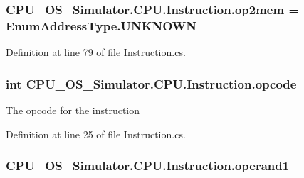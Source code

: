 \subsubsection[{op2mem}]{ C\+P\+U\+\_\+\+O\+S\+\_\+\+Simulator.\+C\+P\+U.\+Instruction.\+op2mem = {\bf Enum\+Address\+Type.\+U\+N\+K\+N\+O\+W\+N}\hspace{0.3cm}{\ttfamily [private]}}\label{class_c_p_u___o_s___simulator_1_1_c_p_u_1_1_instruction_aff693a62e411c80f794d0443addfd04b}


Definition at line 79 of file Instruction.\+cs.

\hypertarget{class_c_p_u___o_s___simulator_1_1_c_p_u_1_1_instruction_aa8fa753bf6e1b6ffff7060ec90f930af}{}
\subsubsection[{opcode}]{\setlength{\rightskip}{0pt plus 5cm}int C\+P\+U\+\_\+\+O\+S\+\_\+\+Simulator.\+C\+P\+U.\+Instruction.\+opcode\hspace{0.3cm}{\ttfamily [private]}}\label{class_c_p_u___o_s___simulator_1_1_c_p_u_1_1_instruction_aa8fa753bf6e1b6ffff7060ec90f930af}


The opcode for the instruction 



Definition at line 25 of file Instruction.\+cs.

\hypertarget{class_c_p_u___o_s___simulator_1_1_c_p_u_1_1_instruction_ab829270aeebc597814ded59f5265b452}{}
\subsubsection[{operand1}]{ C\+P\+U\+\_\+\+O\+S\+\_\+\+Simulator.\+C\+P\+U.\+Instruction.\+operand1\hspace{0.3cm}{\ttfamily [private]}}\label{class_c_p_u___o_s___simulator_1_1_c_p_u_1_1_instruction_ab829270aeebc597814ded59f5265b452}



